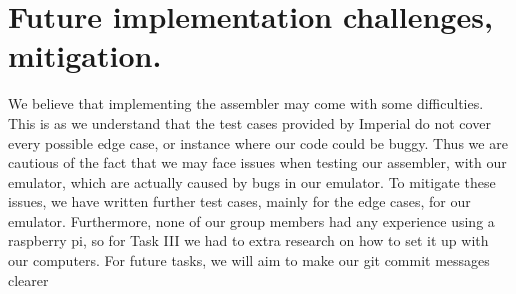 \documentclass[11pt]{article}
\begin{document}
\section{ Future implementation challenges, mitigation.}

We believe that implementing the assembler may come with some difficulties. This is as we understand that the test cases provided by Imperial do not cover every possible edge case, or instance
where our code could be buggy. Thus we are cautious of the fact that we may face issues when
testing our assembler, with our emulator, which are actually caused by bugs in our emulator. To
mitigate these issues, we have written further test cases, mainly for the edge cases, for our emulator.
Furthermore, none of our group members had any experience using a raspberry pi, so for Task III
we had to extra research on how to set it up with our computers.
For future tasks, we will aim to make our git commit messages clearer
\end{document}
